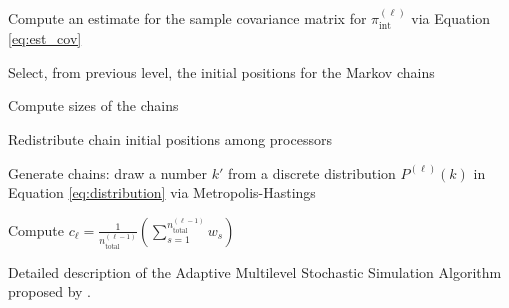 \begin{algorithm}[!htb]
{ Compute an estimate for the sample covariance matrix for $\pi_\text{int}^{(\ell)}$ via Equation \eqref{eq:est_cov}\;
 
  
 Select, from previous level, the initial positions for the Markov chains\;  

 Compute sizes of the chains          
 
 Redistribute chain initial positions among processors\; 
 

 Generate chains: draw a number $k'$ from a discrete distribution $P^{(\ell)}(k)$ in Equation \eqref{eq:distribution} via Metropolis-Hastings 
 
 Compute $c_{\ell} =\frac{1}{ n_\text{total}^{(\ell-1)}}  \left( \sum_{s=1}^{n_\text{total}^{(\ell-1)}} w_{s} \right)$ 
 
 }
\caption{Detailed description of the  Adaptive Multilevel Stochastic Simulation Algorithm proposed by \cite{CheungPrudencio2012}.}\label{alg:ML}
\end{algorithm}




%  
%  
%  
 

